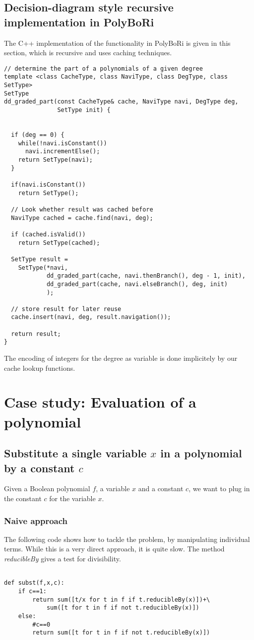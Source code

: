 \documentclass[]{article}
\newcommand{\PolyBoRi}{{\sc PolyBoRi}\xspace}
\newcommand{\functionname}[1]{\textit{#1}\xspace}
\begin{document}
\subsection{Decision-diagram style recursive implementation in \PolyBoRi}
The C++ implementation of the functionality in \PolyBoRi is given in this section, which is recursive and uses caching techniques.
\begin{verbatim}
// determine the part of a polynomials of a given degree
template <class CacheType, class NaviType, class DegType, class SetType>
SetType
dd_graded_part(const CacheType& cache, NaviType navi, DegType deg,  
               SetType init) {


  if (deg == 0) {
    while(!navi.isConstant())
      navi.incrementElse();
    return SetType(navi);
  }

  if(navi.isConstant())
    return SetType();

  // Look whether result was cached before
  NaviType cached = cache.find(navi, deg);

  if (cached.isValid())
    return SetType(cached);

  SetType result = 
    SetType(*navi,  
            dd_graded_part(cache, navi.thenBranch(), deg - 1, init),
            dd_graded_part(cache, navi.elseBranch(), deg, init)
            );

  // store result for later reuse
  cache.insert(navi, deg, result.navigation());

  return result;
}
\end{verbatim}
The encoding of integers for the degree as variable is done implicitely by our cache lookup functions.

\section{Case study: Evaluation of a polynomial}

\subsection{Substitute a single variable $x$ in a polynomial by a constant $c$}

Given a Boolean polynomial $f$, a variable $x$ and a constant $c$, we want to plug in the constant $c$ for the variable $x$.
\subsubsection{Naive approach}
The following code shows how to tackle the problem, by manipulating individual terms.
While this is a very direct approach, it is quite slow.
The method \functionname{reducibleBy} gives a test for divisibility.
\begin{verbatim}

def subst(f,x,c):
    if c==1:
        return sum([t/x for t in f if t.reducibleBy(x)])+\
            sum([t for t in f if not t.reducibleBy(x)])
    else:
        #c==0
        return sum([t for t in f if not t.reducibleBy(x)])

\end{verbatim}
\end{document}
